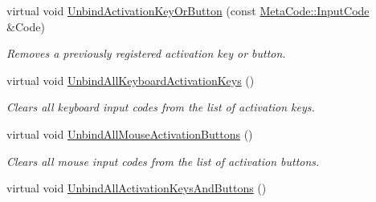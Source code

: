 \begin{DoxyCompactItemize}
virtual void \hyperlink{classphys_1_1UI_1_1Button_a18f51eeb5685ed858b8842f65d566102}{UnbindActivationKeyOrButton} (const \hyperlink{classphys_1_1MetaCode_a3e501cbb5bf0f6f1fdb7211465bda8d8}{MetaCode::InputCode} \&Code)
\begin{DoxyCompactList}\small\item\em Removes a previously registered activation key or button. \item\end{DoxyCompactList}\item 
\hypertarget{classphys_1_1UI_1_1Button_a76b52d72810865ab05a6423a60894d50}{
virtual void \hyperlink{classphys_1_1UI_1_1Button_a76b52d72810865ab05a6423a60894d50}{UnbindAllKeyboardActivationKeys} ()}
\label{d8/d88/classphys_1_1UI_1_1Button_a76b52d72810865ab05a6423a60894d50}

\begin{DoxyCompactList}\small\item\em Clears all keyboard input codes from the list of activation keys. \item\end{DoxyCompactList}\item 
\hypertarget{classphys_1_1UI_1_1Button_ac1e6ed278f41bc49329e1fc1e445699c}{
virtual void \hyperlink{classphys_1_1UI_1_1Button_ac1e6ed278f41bc49329e1fc1e445699c}{UnbindAllMouseActivationButtons} ()}
\label{d8/d88/classphys_1_1UI_1_1Button_ac1e6ed278f41bc49329e1fc1e445699c}

\begin{DoxyCompactList}\small\item\em Clears all mouse input codes from the list of activation buttons. \item\end{DoxyCompactList}\item 
\hypertarget{classphys_1_1UI_1_1Button_a6b1a993ca1b4050e3741a77f0f1643df}{
virtual void \hyperlink{classphys_1_1UI_1_1Button_a6b1a993ca1b4050e3741a77f0f1643df}{UnbindAllActivationKeysAndButtons} ()}
\label{d8/d88/classphys_1_1UI_1_1Button_a6b1a993ca1b4050e3741a77f0f1643df}


\end{DoxyCompactItemize}
